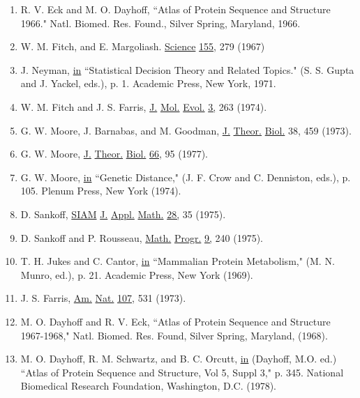 \documentclass[12pt]{article}
\def\ul{\underline}
\begin{document}
\begin{enumerate}

\item R. V. Eck and M. O. Dayhoff, ``Atlas of Protein Sequence and Structure 1966." Natl. Biomed. Res. Found., Silver Spring, Maryland, 1966.

\item W. M. Fitch, and E. Margoliash.  \ul{Science} \ul{155,} 279 (1967) 

\item J. Neyman, \ul{in} ``Statistical Decision Theory and Related Topics." (S. S. Gupta and J. Yackel, eds.), p. 1.  Academic Press, New York, 1971.

\item W. M. Fitch and J. S. Farris, \ul{J.} \ul{Mol.} \ul{Evol.} \ul{3,} 263 (1974).

\item G. W. Moore, J. Barnabas, and M. Goodman, \ul{J.} \ul{Theor.} \ul{Biol.} 38, 459 (1973).

\item G. W. Moore, \ul{J.} \ul{Theor.} \ul{Biol.} \ul{66,} 95 (1977).  

\item G. W. Moore, \ul{in} ``Genetic Distance," (J. F. Crow and C. Denniston, eds.), p. 105. Plenum Press, New York (1974).  

\item D. Sankoff, \ul{SIAM} \ul{J.} \ul{Appl.} \ul{Math.}  \ul{28,} 35 (1975).  

\item D. Sankoff and P. Rousseau, \ul{Math.} \ul{Progr.} \ul{9,} 240 (1975). 

\item T. H. Jukes and C. Cantor, \ul{in} ``Mammalian Protein Metabolism,"
 (M. N. Munro, ed.), p. 21.  Academic Press, New York (1969).

\item J. S. Farris,  \ul{Am.} \ul{Nat.} \ul{107,} 531 (1973).  

\item M. O. Dayhoff and R. V. Eck, ``Atlas of Protein Sequence and Structure 1967-1968," Natl. Biomed. Res. Found, Silver Spring, Maryland, (1968).  

\item  M. O. Dayhoff, R. M. Schwartz, and B. C. Orcutt, \ul{in} (Dayhoff, M.O.
ed.) ``Atlas  of  Protein  Sequence and Structure,  Vol 5,  Suppl 3," p. 345.
National Biomedical Research Foundation, Washington, D.C. (1978).


\end{enumerate}
\end{document}
